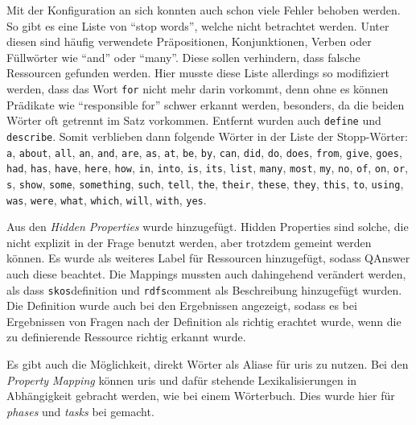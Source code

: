 Mit der Konfiguration an sich konnten auch schon viele Fehler behoben werden.
So gibt es eine Liste von \enquote{stop words}, welche nicht betrachtet werden.
Unter diesen sind häufig verwendete Präpositionen, Konjunktionen, Verben oder Füllwörter wie \enquote{and} oder \enquote{many}.
Diese sollen verhindern, dass falsche Ressourcen gefunden werden.
Hier musste diese Liste allerdings so modifiziert werden, dass das Wort \texttt{for} nicht mehr darin vorkommt, denn ohne es können Prädikate wie \enquote{responsible for} schwer erkannt werden,
besonders, da die beiden Wörter oft getrennt im Satz vorkommen.
Entfernt wurden auch \texttt{define} und \texttt{describe}.
Somit verblieben dann folgende Wörter in der Liste der Stopp-Wörter:
\texttt{a}, \texttt{about}, \texttt{all}, \texttt{an}, \texttt{and}, \texttt{are}, \texttt{as}, \texttt{at}, \texttt{be}, \texttt{by}, \texttt{can}, \texttt{did}, \texttt{do}, \texttt{does}, \texttt{from}, \texttt{give}, \texttt{goes}, \texttt{had}, \texttt{has}, \texttt{have}, \texttt{here}, \texttt{how}, \texttt{in}, \texttt{into}, \texttt{is}, \texttt{its}, \texttt{list}, \texttt{many}, \texttt{most}, \texttt{my}, \texttt{no}, \texttt{of}, \texttt{on}, \texttt{or}, \texttt{s}, \texttt{show}, \texttt{some}, \texttt{something}, \texttt{such}, \texttt{tell}, \texttt{the}, \texttt{their}, \texttt{these}, \texttt{they}, \texttt{this}, \texttt{to}, \texttt{using}, \texttt{was}, \texttt{were}, \texttt{what}, \texttt{which}, \texttt{will}, \texttt{with}, \texttt{yes}.

Aus den \emph{Hidden Properties} wurde  hinzugefügt.
Hidden Properties sind solche, die nicht explizit in der Frage benutzt werden, aber trotzdem gemeint werden können.
Es wurde  als weiteres Label für Ressourcen hinzugefügt, sodass QAnswer auch diese beachtet.
Die Mappings mussten auch dahingehend verändert werden, als dass \texttt{skos}{definition}
und \texttt{rdfs}{comment} als Beschreibung hinzugefügt wurden.
Die Definition wurde auch bei den Ergebnissen angezeigt, sodass es bei Ergebnissen von Fragen nach der Definition als richtig erachtet wurde, wenn die zu definierende Ressource richtig erkannt wurde.

Es gibt auch die Möglichkeit, direkt Wörter als Aliase für \acp{uri} zu nutzen.
Bei den \emph{Property Mapping} können \acp{uri} und dafür stehende Lexikalisierungen in Abhängigkeit gebracht werden, wie bei einem Wörterbuch.
Dies wurde hier für \emph{phases} und \emph{tasks} bei  gemacht.


